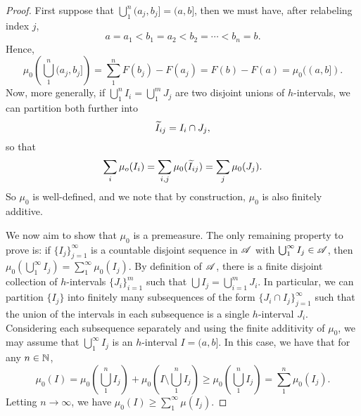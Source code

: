 \documentclass[12pt]{article} %
\begin{document}
\begin{proof}
    First suppose that $\bigcup_1^n (a_j, b_j] = (a, b]$, then we must have, after relabeling index $j$, \[a = a_1 < b_1 = a_2 < b_2 = \cdots < b_n = b.\] Hence, \[\mu_0 \left( \bigcup_1^n (a_j, b_j] \right) = \sum_1^n F(b_j) - F(a_j) = F(b) - F(a) = \mu_0((a, b]).\]
    Now, more generally, if $\bigcup_1^n I_i = \bigcup_1^m J_j$ are two disjoint unions of $h$-intervals, we can partition both further into \[\widetilde{I}_{ij} = I_i \cap J_j,\] so that \[\sum_i \mu_o(I_i) = \sum_{i, j} \mu_0(\widetilde{I}_{ij}) = \sum_j \mu_0(J_j).\] So $\mu_0$ is well-defined, and we note that by construction, $\mu_0$ is also finitely additive.

    We now aim to show that $\mu_0$ is a premeasure. The only remaining property to prove is: if $\{I_j\}_{j=1}^{\infty}$ is a countable disjoint sequence in $\mathscr{A}$ with $\bigcup_1^\infty I_j \in \mathscr{A}$, then $\mu_0\left(\bigcup_1^\infty I_j\right) = \sum_1^\infty \mu_0(I_j)$. By definition of $\mathscr{A}$, there is a finite disjoint collection of $h$-intervals $\{J_{i}\}_{i=1}^{m}$ such that $\bigcup I_j = \bigcup_{i=1}^{m} J_i$. In particular, we can partition $\{I_j\}$ into finitely many subsequences of the form $\{J_i \cap I_j\}_{j=1}^{\infty}$ such that the union of the intervals in each subsequence is a single $h$-interval $J_i$. Considering each subsequence separately and using the finite additivity of $\mu_0$, we may assume that $\bigcup_1^\infty I_j$ is an $h$-interval $I = (a, b]$. In this case, we have that for any $n \in \mathbb{N}$, \[\mu_0(I) = \mu_0\left( \bigcup_1^n I_j \right) + \mu_0 \left( I \setminus \bigcup_1^n I_j \right) \geq \mu_0\left(\bigcup_1^n I_j \right) = \sum_1^n \mu_0(I_j).\] Letting $n \to \infty$, we have $\mu_0(I) \geq \sum_1^\infty \mu(I_j)$.


\end{proof}
\end{document}
